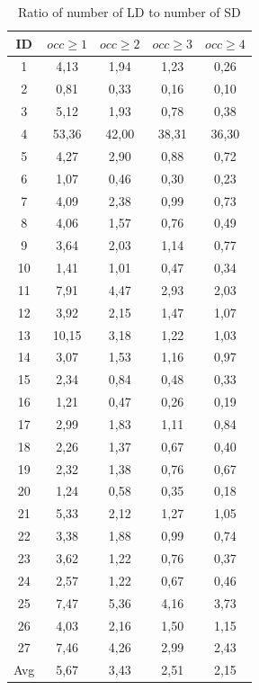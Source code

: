 \documentclass[conference]{IEEEtran}
\begin{document}
\begin{table}[!h]
\renewcommand{\arraystretch}{1.25}
\caption{Ratio of number of LD to number of SD}
\label{table:ld_ratio}
\centering
\begin{tabular}{|c|c|c|c|c|}
\hline
    ID  & $occ\geq 1$ & $occ\geq 2$ & $occ\geq 3$ & $occ\geq 4$  \\
\hline
1	&	4,13	&	1,94	&	1,23	&	0,26	\\
2	&	0,81	&	0,33	&	0,16	&	0,10	\\
3	&	5,12	&	1,93	&	0,78	&	0,38	\\
4	&	53,36	&	42,00	&	38,31	&	36,30	\\
5	&	4,27	&	2,90	&	0,88	&	0,72	\\
6	&	1,07	&	0,46	&	0,30	&	0,23	\\
7	&	4,09	&	2,38	&	0,99	&	0,73	\\
8	&	4,06	&	1,57	&	0,76	&	0,49	\\
9	&	3,64	&	2,03	&	1,14	&	0,77	\\
10	&	1,41	&	1,01	&	0,47	&	0,34	\\
11	&	7,91	&	4,47	&	2,93	&	2,03	\\
12	&	3,92	&	2,15	&	1,47	&	1,07	\\
13	&	10,15	&	3,18	&	1,22	&	1,03	\\
14	&	3,07	&	1,53	&	1,16	&	0,97	\\
15	&	2,34	&	0,84	&	0,48	&	0,33	\\
16	&	1,21	&	0,47	&	0,26	&	0,19	\\
17	&	2,99	&	1,83	&	1,11	&	0,84	\\
18	&	2,26	&	1,37	&	0,67	&	0,40	\\
19	&	2,32	&	1,38	&	0,76	&	0,67	\\
20	&	1,24	&	0,58	&	0,35	&	0,18	\\
21	&	5,33	&	2,12	&	1,27	&	1,05	\\
22	&	3,38	&	1,88	&	0,99	&	0,74	\\
23	&	3,62	&	1,22	&	0,76	&	0,37	\\
24	&	2,57	&	1,22	&	0,67	&	0,46	\\
25	&	7,47	&	5,36	&	4,16	&	3,73	\\
26	&	4,03	&	2,16	&	1,50	&	1,15	\\
27	&	7,46	&	4,26	&	2,99	&	2,43	\\
\hline
Avg	&	5,67	&	3,43	&	2,51	&	2,15	\\
\hline
\end{tabular}
\end{table}
\end{document}
